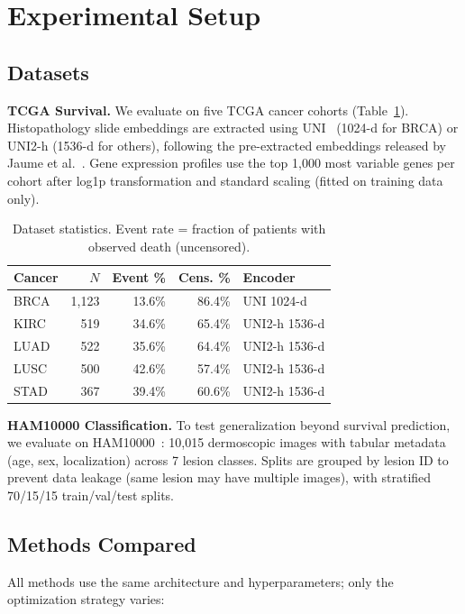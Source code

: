 \documentclass[10pt,twocolumn]{article}
\begin{document}
\section{Experimental Setup}

\subsection{Datasets}

\textbf{TCGA Survival.}
We evaluate on five TCGA cancer cohorts (Table~\ref{tab:datasets}).
Histopathology slide embeddings are extracted using
UNI~\cite{chen2024uni} (1024-d for BRCA) or UNI2-h (1536-d for
others), following the pre-extracted embeddings released by
Jaume et al.~\cite{jaume2024tangle}. Gene expression profiles use
the top 1,000 most variable genes per cohort after log1p
transformation and standard scaling (fitted on training data only).

\begin{table}[t]
\centering
\caption{Dataset statistics. Event rate = fraction of patients with
observed death (uncensored).}
\label{tab:datasets}
\begin{tabular}{lrrrl}
\toprule
Cancer & $N$ & Event \% & Cens. \% & Encoder \\
\midrule
BRCA & 1,123 & 13.6\% & 86.4\% & UNI 1024-d \\
KIRC & 519   & 34.6\% & 65.4\% & UNI2-h 1536-d \\
LUAD & 522   & 35.6\% & 64.4\% & UNI2-h 1536-d \\
LUSC & 500   & 42.6\% & 57.4\% & UNI2-h 1536-d \\
STAD & 367   & 39.4\% & 60.6\% & UNI2-h 1536-d \\
\bottomrule
\end{tabular}
\end{table}

\textbf{HAM10000 Classification.}
To test generalization beyond survival prediction, we evaluate on
HAM10000~\cite{tschandl2018ham10000}: 10,015 dermoscopic images with
tabular metadata (age, sex, localization) across 7 lesion classes.
Splits are grouped by lesion ID to prevent data leakage (same
lesion may have multiple images), with stratified 70/15/15
train/val/test splits.

\subsection{Methods Compared}

All methods use the same architecture and hyperparameters; only the
optimization strategy varies:
\end{document}

